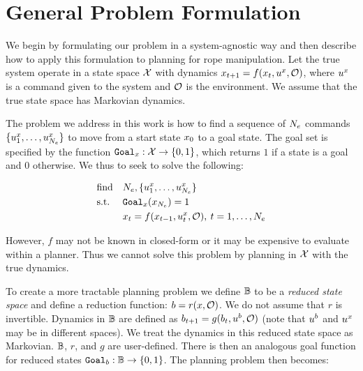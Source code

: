 

\section{General Problem Formulation}


We begin by formulating our problem in a system-agnostic way and then describe how to apply this formulation to planning for rope manipulation. Let the true system operate in a state space $\mathcal{X}$ with dynamics $x_{t+1} = f(x_t,u^x,\mathcal{O})$, where $u^x$ is a command given to the system and $\mathcal{O}$ is the environment. We assume that the true state space has Markovian dynamics. 

The problem we address in this work is how to find a sequence of $N_e$ commands $\{u^x_1, \dots, u^x_{N_e} \}$ to move from a start state $x_0$ to a goal state. The goal set is specified by the function $\texttt{Goal}_x: \mathcal{X} \rightarrow \{ 0,1 \}$, which returns $1$ if a state is a goal and $0$ otherwise. We thus to seek to solve the following:


\begin{equation}
    \begin{aligned}
        & \text{find}   & & N_e, \{u^x_1, \dots, u^x_{N_e} \} \\
        & \text{s.t.}   & & \texttt{Goal}_x(x_{N_e}) = 1\\ 
        &               & & x_t = f(x_{t-1}, u^x_t,\mathcal{O}), \:  t = 1, \dots, N_e\\
    \end{aligned}
    \label{eqn:main_planning_problem}
\end{equation}

\noindent However, $f$ may not be known in closed-form or it may be expensive to evaluate within a planner. Thus we cannot solve this problem by planning in $\mathcal{X}$ with the true dynamics.

To create a more tractable planning problem we define $\mathbb{B}$ to be a \textit{reduced state space} and define a reduction function: $b = r(x,\mathcal{O})$. We do not assume that $r$ is invertible. Dynamics in $\mathbb{B}$ are defined as $b_{t+1} = g(b_t,u^b,\mathcal{O})$ (note that $u^b$ and $u^x$ may be in different spaces). We treat the dynamics in this reduced state space as Markovian. $\mathbb{B}$, $r$, and $g$ are user-defined. There is then an analogous goal function for reduced states $\texttt{Goal}_b: \mathbb{B} \rightarrow \{ 0,1 \}$.  The planning problem then becomes:


